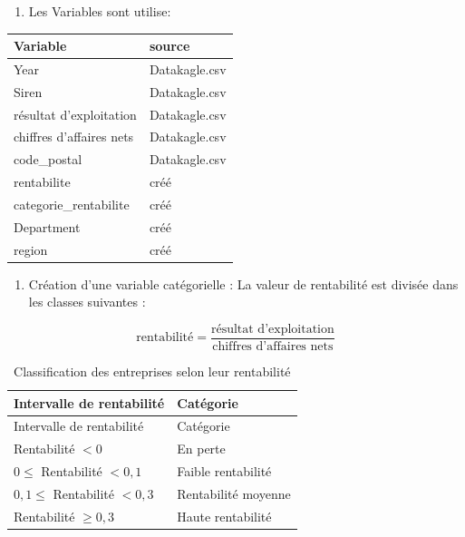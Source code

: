 \documentclass[mstat,12pt]{unswthesis}
\begin{document}
\begin{enumerate}
\def\labelenumi{\arabic{enumi})}
\setcounter{enumi}{1}
\tightlist
\item
  Les Variables sont utilise:
\end{enumerate}

\begin{longtable}[]{@{}ll@{}}
\toprule\noalign{}
Variable & source \\
\midrule\noalign{}
\endhead
\bottomrule\noalign{}
\endlastfoot
Year & Datakagle.csv \\
Siren & Datakagle.csv \\
résultat d'exploitation & Datakagle.csv \\
chiffres d'affaires nets & Datakagle.csv \\
code\_postal & Datakagle.csv \\
rentabilite & créé \\
categorie\_rentabilite & créé \\
Department & créé \\
region & créé \\
\end{longtable}

\medskip

\begin{enumerate}
\def\labelenumi{\arabic{enumi})}
\setcounter{enumi}{2}
\tightlist
\item
  Création d'une variable catégorielle : La valeur de rentabilité est
  divisée dans les classes suivantes :
\end{enumerate}

\[
      \text{rentabilité} = \frac{\text{résultat d'exploitation}}{\text{chiffres d’affaires nets}}
\]

\medskip

\begin{longtable}[]{@{}ll@{}}
\caption{Classification des entreprises selon leur
rentabilité}\tabularnewline
\toprule\noalign{}
Intervalle de rentabilité & Catégorie \\
\midrule\noalign{}
\endfirsthead
\toprule\noalign{}
Intervalle de rentabilité & Catégorie \\
\midrule\noalign{}
\endhead
\bottomrule\noalign{}
\endlastfoot
Rentabilité \(< 0\) & En perte \\
\(0 \leq\) Rentabilité \(< 0{,}1\) & Faible rentabilité \\
\(0{,}1 \leq\) Rentabilité \(< 0{,}3\) & Rentabilité moyenne \\
Rentabilité \(\geq 0{,}3\) & Haute rentabilité \\
\end{longtable}
\end{document}
